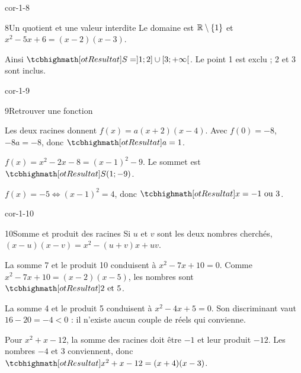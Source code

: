 \begin{blocLivre}{cor-1-8}
\begin{corrige}{8}{Un quotient et une valeur interdite}
Le domaine est $\mathbb{R}\setminus\{1\}$ et $x^2-5x+6=(x-2)(x-3)$.
\begin{center}\begin{tableau}
\end{tableau}\end{center}
Ainsi $\res{S=]1;2]\cup[3;+\infty[}$. Le point 1 est exclu ; 2 et 3 sont inclus.
\end{corrige}
\end{blocLivre}
\begin{blocLivre}{cor-1-9}
\begin{corrige}{9}{Retrouver une fonction}
\begin{questions}
\item Les deux racines donnent $f(x)=a(x+2)(x-4)$. Avec $f(0)=-8$,
$-8a=-8$, donc $\res{a=1}$.
\item $f(x)=x^2-2x-8=(x-1)^2-9$. Le sommet est $\res{S(1;-9)}$.
\item $f(x)=-5\iff(x-1)^2=4$, donc $\res{x=-1\text{ ou }3}$.
\end{questions}
\label{figlivre-r01-09-parabole-cor}

\end{corrige}
\end{blocLivre}
\begin{blocLivre}{cor-1-10}
\begin{corrige}{10}{Somme et produit des racines}
Si $u$ et $v$ sont les deux nombres cherchés, $(x-u)(x-v)=x^2-(u+v)x+uv$.
\begin{questions}
\item La somme 7 et le produit 10 conduisent à $x^2-7x+10=0$.
Comme $x^2-7x+10=(x-2)(x-5)$, les nombres sont $\res{2\text{ et }5}$.
\item La somme 4 et le produit 5 conduisent à $x^2-4x+5=0$.
Son discriminant vaut $16-20=-4<0$ : il n’existe aucun couple de réels qui convienne.
\item Pour $x^2+x-12$, la somme des racines doit être $-1$ et leur produit $-12$.
Les nombres $-4$ et 3 conviennent, donc $\res{x^2+x-12=(x+4)(x-3)}$.
\end{questions}

\end{corrige}
\end{blocLivre}
